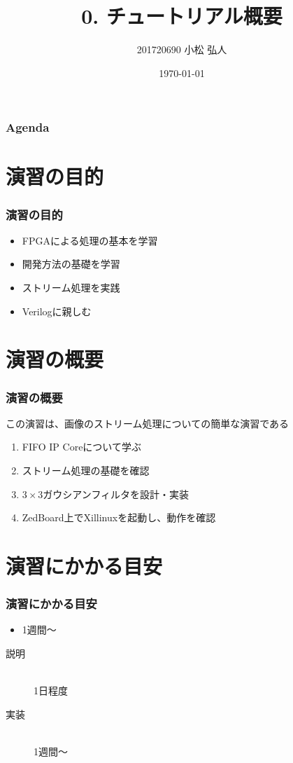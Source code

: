 ﻿\documentclass[dvipdfmx]{beamer}
\title{0. チュートリアル概要}
\author{201720690 小松 弘人}
\date{\today}
\begin{document}
\maketitle

\begin{frame}
	\frametitle{Agenda}
	\tableofcontents
\end{frame}

\section{演習の目的}
\begin{frame}
	\frametitle{演習の目的}

	\begin{itemize}
		\item
			FPGAによる処理の基本を学習
			\vfill
		\item 
			開発方法の基礎を学習
			\vfill
		\item
			ストリーム処理を実践
			\vfill
		\item
			Verilogに親しむ
	\end{itemize}
\end{frame}

\section{演習の概要}
\begin{frame}
	\frametitle{演習の概要}
	この演習は、画像のストリーム処理についての簡単な演習である
	\begin{enumerate}
		\item
			FIFO IP Coreについて学ぶ
			\vfill
		\item
			ストリーム処理の基礎を確認
			\vfill
		\item
			$3\!\times\!3$ガウシアンフィルタを設計・実装
			\vfill
		\item
			ZedBoard上でXillinuxを起動し、動作を確認
	\end{enumerate}
\end{frame}

\section{演習にかかる目安}
\begin{frame}
	\frametitle{演習にかかる目安}
	\begin{itemize}
		\item
			1週間～
	\end{itemize}
	\begin{description}
		\item[説明]\mbox{}\\
			1日程度
		\item[実装]\mbox{}\\
			1週間～
	\end{description}
\end{frame}
\end{document}
